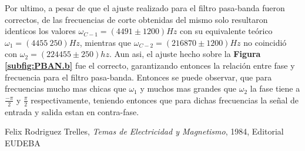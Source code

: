 \documentclass[11pt,a4paper]{article}
\begin{document}
Por ultimo, a pesar de que el ajuste realizado para el filtro pasa-banda fueron correctos, de las frecuencias de corte obtenidas del mismo solo resultaron identicos los valores $\omega_{C-1} = (4491 \pm 1200)Hz$ con su equivalente teórico $\omega_1 = (4455 \ 250)Hz$, mientras que $\omega_{C-2} = (216870 \pm 1200)Hz$ no coincidió con $\omega_2 = (224455 \pm 250)hz$. Aun asi, el ajuste hecho sobre la \textbf{Figura \ref{subfig:PBAN.b}} fue el correcto, garantizando entonces la relación entre fase y frecuencia para el filtro pasa-banda. Entonces se puede observar, que para frecuencias mucho mas chicas que $\omega_1$ y muchos mas grandes que $\omega_2$ la fase tiene a $\frac{-\pi}{2}$ y $\frac{\pi}{2}$ respectivamente, teniendo entonces que para dichas frecuencias la señal de entrada y salida estan en contra-fase.

\label{sec:conclusiones}








\begin{thebibliography}{1}
  Felix Rodriguez Trelles, \textit{Temas de Electricidad y Magnetismo}, 1984, Editorial EUDEBA
\end{thebibliography}
 
\end{document}
